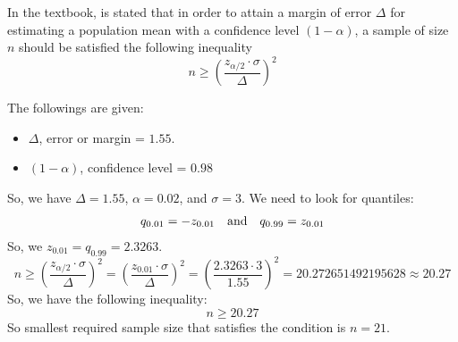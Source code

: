 In the textbook, is stated that in order to attain a margin of error $\Delta$ for estimating a population mean with a confidence level $(1 - \alpha)$, a sample of size $n$ should be satisfied the following inequality
\begin{equation*}
  n \geq \left( \frac{z_{\alpha/2} \cdot \sigma}{\Delta} \right)^2
\end{equation*}

\noindent The followings are given:
\begin{itemize}[leftmargin=.6cm]
  \item $\Delta$, error or margin = $1.55$.
  \item $(1 - \alpha)$, confidence level = $0.98$
\end{itemize}

\noindent So, we have $\Delta = 1.55$, $\alpha = 0.02$, and $\sigma = 3$. We need to look for quantiles:
\begin{align*}
  &q_{0.01} = -z_{0.01} &\textnormal{and}& &q_{0.99} = z_{0.01}
\end{align*}
So, we $z_{0.01} = q_{0.99} = 2.3263$.
\begin{equation*}
  n \geq \left( \frac{z_{\alpha/2} \cdot \sigma}{\Delta} \right)^2 = \left( \frac{z_{0.01} \cdot \sigma}{\Delta} \right)^2 = \left( \frac{2.3263 \cdot 3}{1.55} \right)^2 = 20.272651492195628 \approx 20.27
\end{equation*}
So, we have the following inequality:
\begin{equation*}
  n \geq 20.27
\end{equation*}
So smallest required sample size that satisfies the condition is $n = 21$.
